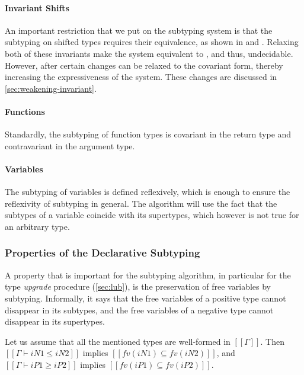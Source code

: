 \paragraph{Invariant Shifts}
An important restriction that we put on the subtyping system is
that the subtyping on shifted types requires their equivalence,
as shown in  and
. Relaxing both of these
invariants make the system equivalent to \systemf, 
and thus, undecidable. 
However, after certain changes 
 can be relaxed to the covariant form,
thereby increasing the expressiveness of the system. These
changes are discussed in \cref{sec:weakening-invariant}.

\paragraph{Functions}
Standardly, the subtyping of function types is covariant in the return type
and contravariant in the argument type.

\paragraph{Variables}
The subtyping of variables is defined reflexively,
which is enough to ensure the reflexivity of subtyping in general.
The algorithm will use the fact that the subtypes of a variable 
coincide with its supertypes, which however is not true for an
arbitrary type.

\subsubsection{Properties of the Declarative Subtyping}
\label{sec:decl-subtyping-properties}

A property that is important for the subtyping algorithm, 
in particular for the type \emph{upgrade} procedure (\cref{sec:lub}),
is the preservation of free variables by subtyping.
Informally, it says that the free variables
of a positive type cannot disappear in its subtypes,
and the free variables of a negative type
cannot disappear in its supertypes.

\begin{property}
  \label{prop:subtyping-preserves-fv}
  Let us assume that all the mentioned types are well-formed in $[[Γ]]$. Then
  $[[Γ ⊢ iN1 ≤ iN2]]$ implies $[[fv(iN1) ⊆ fv(iN2)]]$,
  and $[[Γ ⊢ iP1 ≥ iP2]]$ implies $[[fv(iP1) ⊆ fv(iP2)]]$.
\end{property}

